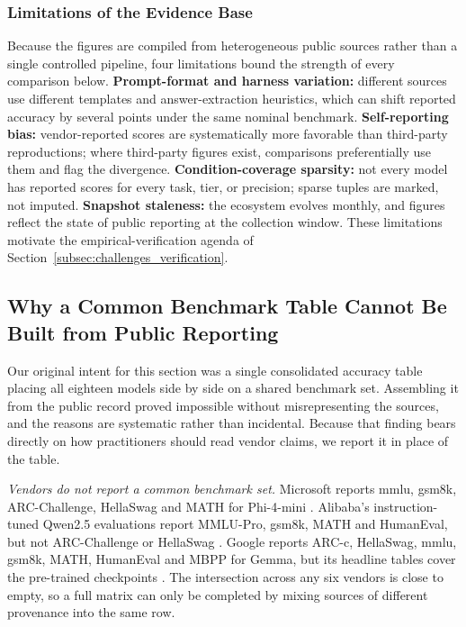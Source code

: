 \subsubsection{Limitations of the Evidence Base}
\label{subsec:reported_limits}
Because the figures are compiled from heterogeneous public sources rather than a
single controlled pipeline, four limitations bound the strength of every
comparison below. \textbf{Prompt-format and harness variation:} different sources
use different templates and answer-extraction heuristics, which can shift reported
accuracy by several points under the same nominal benchmark. \textbf{Self-reporting
bias:} vendor-reported scores are systematically more favorable than third-party
reproductions; where third-party figures exist, comparisons preferentially use
them and flag the divergence. \textbf{Condition-coverage sparsity:} not every
model has reported scores for every task, tier, or precision; sparse tuples are
marked, not imputed. \textbf{Snapshot staleness:} the ecosystem evolves monthly,
and figures reflect the state of public reporting at the collection window. These
limitations motivate the empirical-verification agenda of
Section~\ref{subsec:challenges_verification}.

\subsection{Why a Common Benchmark Table Cannot Be Built from Public Reporting}
\label{subsec:reported_overall}

Our original intent for this section was a single consolidated accuracy table
placing all eighteen models side by side on a shared benchmark set. Assembling it
from the public record proved impossible without misrepresenting the sources, and
the reasons are systematic rather than incidental. Because that finding bears
directly on how practitioners should read vendor claims, we report it in place of
the table.

\emph{Vendors do not report a common benchmark set.} Microsoft reports
\gls{mmlu}, \gls{gsm8k}, ARC-Challenge, HellaSwag and MATH for Phi-4-mini
\citep{microsoft2025phi4mini}. Alibaba's instruction-tuned Qwen2.5 evaluations
report MMLU-Pro, \gls{gsm8k}, MATH and HumanEval, but not ARC-Challenge or
HellaSwag \citep{qwen2024qwen25}. Google reports ARC-c, HellaSwag, \gls{mmlu},
\gls{gsm8k}, MATH, HumanEval and MBPP for Gemma, but its headline tables cover
the pre-trained checkpoints \citep{gemma2team2024,team2025gemma3}. The
intersection across any six vendors is close to empty, so a full matrix can only
be completed by mixing sources of different provenance into the same row.

